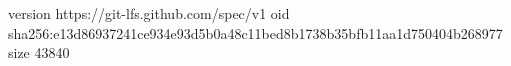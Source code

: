 version https://git-lfs.github.com/spec/v1
oid sha256:e13d86937241ce934e93d5b0a48c11bed8b1738b35bfb11aa1d750404b268977
size 43840
